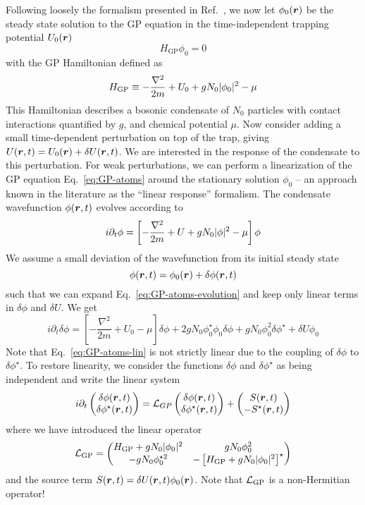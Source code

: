 Following loosely the formalism presented in Ref.~\cite{9783540410478}, we now let $\phi_0(\bm{r})$ be the steady state solution to the GP equation in
the time-independent trapping potential $U_0(\bm{r})$
%
\begin{equation}\label{eq:GP-atoms}
  H_{\text{GP}} \phi_0 = 0
\end{equation}
% 
with the GP Hamiltonian defined as
%
\begin{equation}\label{eq:GP-ham}
  H_{\text{GP}} \equiv -\frac{\nabla^2}{2m} + U_0 + gN_0\vert \phi_0 \vert^2 - \mu
\end{equation}
% 
This Hamiltonian describes a bosonic condensate of $N_0$ particles
with contact interactions quantified by $g$, and chemical potential
$\mu$.  Now consider adding a small time-dependent perturbation on top
of the trap, giving $U(\bm{r},t)=U_0(\bm{r}) + \delta U(\bm{r},t)$. We are
interested in the response of the condensate to this perturbation.
For weak perturbations, we can perform a linearization of the GP
equation Eq.~\eqref{eq:GP-atoms} around the stationary solution
$\phi_0$ -- an approach known in the literature as the ``linear
response'' formalism. The condensate wavefunction $\phi(\bm{r},t)$
evolves according to
%
\begin{equation}\label{eq:GP-atoms-evolution}
  i\partial_t \phi = \left[-\frac{\nabla^2}{2m} + U + gN_0 \vert \phi \vert^2 - \mu\right] \phi
\end{equation}
% 
We assume a small deviation of the wavefunction from its initial
steady state
%
\begin{equation}\label{eq:ansatz-atoms}
  \phi(\bm{r},t) = \phi_0(\bm{r}) + \delta\phi(\bm{r},t)
\end{equation}
% 
such that we can expand Eq.~\eqref{eq:GP-atoms-evolution} and keep only linear terms in $\delta\phi$ and $\delta U$. We get
%
\begin{equation}\label{eq:GP-atoms-lin}
  i\partial_t\delta\phi =  \left[-\frac{\nabla^2}{2m} + U_0-\mu\right]
  \delta\phi + 2 g N_0 \phi_0^{\star}\phi_0\delta\phi + gN_0\phi_0^2\delta\phi^{\star}
  +\delta U\phi_0
\end{equation}
% 
Note that Eq.~\eqref{eq:GP-atoms-lin} is not strictly linear due to
the coupling of $\delta\phi$ to $\delta\phi^{\star}$. To restore
linearity, we consider the functions $\delta\phi$ and
$\delta\phi^{\star}$ as being independent and write the linear system
%
\begin{equation}\label{eq:GP-atoms-system}
  i \partial_t \begin{pmatrix} \delta\phi(\bm{r},t)\\ \delta\phi^{\star}(\bm{r},t) \end{pmatrix}
  = \mathcal{L}_{GP} \begin{pmatrix} \delta\phi(\bm{r},t)\\ \delta\phi^{\star}(\bm{r},t) \end{pmatrix}
  + \begin{pmatrix} S(\bm{r},t)\\ -S^{\star}(\bm{r},t) \end{pmatrix}
\end{equation}
% 
where we have introduced the linear operator
%
\begin{equation}\label{eq:LGP}
  \mathcal{L}_{\text{GP}} = \begin{pmatrix} H_{\text{GP}}+gN_0\vert \phi_0 \vert^2 & g N_0 \phi_0^2\\ -g N_0 \phi_0^{\star 2} & -\left[H_{\text{GP}}+gN_0\vert \phi_0 \vert^2\right]^{\star} \end{pmatrix}
\end{equation}
% 
and the source term $S(\bm{r},t)=\delta U(\bm{r},t)\phi_0(\bm{r})$.  Note that
$\mathcal{L}_{\text{GP}}$ is a non-Hermitian operator!


